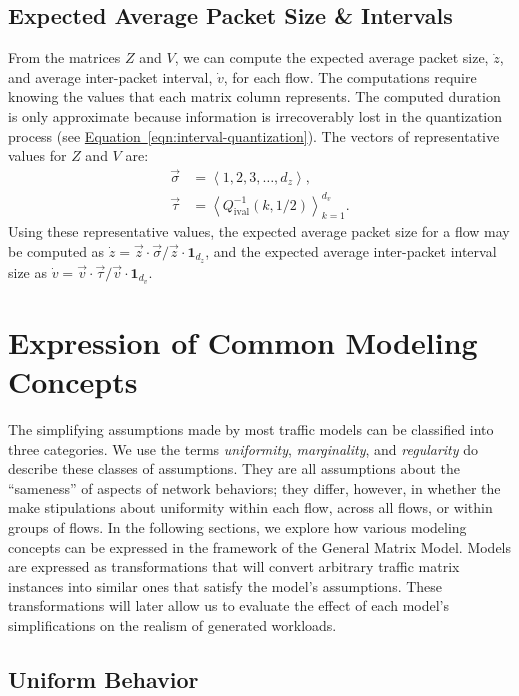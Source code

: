 \documentclass[twocolumn,final]{svjour3}
\newcommand{\Equation}[1]{\hyperref[eqn:#1]{Equation~\ref*{eqn:#1}}}
\newcommand{\Di}{Q^{-1}_{\text{ival}}}
\newcommand{\ones}[1]{\mathbf{1}_{#1}}
\newcommand{\seq}[1]{\left<#1\right>}
\newcommand{\fracx}[2]{#1/#2}
\begin{document}
\subsection{Expected Average Packet Size \& Intervals}
\label{sec:flow-totals}

From the matrices $Z$ and $V$, we can compute the expected average packet size, $\dot{z}$, and average inter-packet interval, $\dot{v}$, for each flow. The computations require knowing the values that each matrix column represents. The computed duration is only approximate because information is irrecoverably lost in the quantization process (see \Equation{interval-quantization}). The vectors of representative values for $Z$ and $V$ are:
\begin{align}
\vec{\sigma}&=\seq{1,2,3,\dots,d_z},\\
\vec{\tau}&=\seq{\Di\left(k,\fracx{1}{2}\right)}_{k=1}^{d_v}.
\end{align}
Using these representative values, the expected average packet size for a flow may be computed as $\dot{z}=\fracx{\vec{z}\cdot\vec{\sigma}}{\vec{z}\cdot\ones{d_z}}$, and the expected average inter-packet interval size as $\dot{v}=\fracx{\vec{v}\cdot\vec{\tau}}{\vec{v}\cdot\ones{d_v}}$.

\section{Expression of Common Modeling Concepts}
\label{sec:modeling-concepts}

The simplifying assumptions made by most traffic models can be classified into three categories. We use the terms \textit{uniformity}, \textit{marginality}, and \textit{regularity} do describe these classes of assumptions. They are all assumptions about the ``sameness'' of aspects of network behaviors; they differ, however, in whether the make stipulations about uniformity within each flow, across all flows, or within groups of flows. In the following sections, we explore how various modeling concepts can be expressed in the framework of the General Matrix Model. Models are expressed as transformations that will convert arbitrary traffic matrix instances into similar ones that satisfy the model's assumptions. These transformations will later allow us to evaluate the effect of each model's simplifications on the realism of generated workloads.

\subsection{Uniform Behavior}
\end{document}
